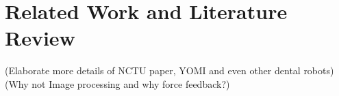 \chapter{Related Work and Literature Review}
(Elaborate more details of NCTU paper, YOMI and even other dental robots)			\\
(Why not Image processing and why force feedback?)								